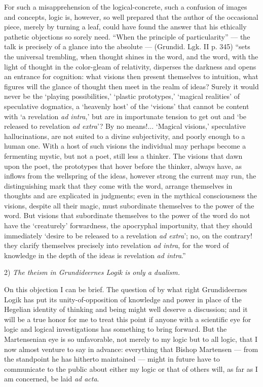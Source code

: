 \documentclass[12pt]{book}
\newcommand{\opage}[1]{\marginnote{\footnotesize\textit{[#1]}}}
\begin{document}
For such a misapprehension of the logical-concrete, such a confusion of images and concepts, logic is, however, so well prepared that the author of the occasional piece, merely by turning a leaf, could have found the answer that his ethically pathetic objections so sorely need. ``When the principle of particularity'' --- the talk is precisely of a glance into the absolute --- (Grundid. Lgk. II p. 345) ``sets the universal trembling, when thought shines in the word, and the word, with the light of thought in the color-gleam of relativity, disperses the darkness and opens an entrance for cognition: what visions then present themselves to intuition, what figures will the glance of thought then meet in the realm of ideas? Surely it would never be the `playing possibilities,' `plastic prototypes,' `magical realities' of speculative dogmatics, a `heavenly host' of the `visions' that cannot be content with `a revelation \textit{ad intra},' but are in importunate tension to get out and `be released to revelation \textit{ad extra}'? By no means!... `Magical visions,' speculative hallucinations, are not suited to a divine subjectivity, and poorly enough to a human one. With a host of such visions the individual may perhaps become a fermenting mystic, but not a poet, still less a thinker. The visions that dawn upon the poet, the prototypes that hover before the thinker, always have, as inflows from the wellspring of the ideas, however strong the current may run, the distinguishing mark that they come with the word, arrange themselves in thoughts and are explicated in judgments; even in the mythical consciousness the visions, despite all their magic, must subordinate themselves to the power of the word. But visions that subordinate themselves to the power of the word do not have the `creaturely' forwardness, the apocryphal importunity, that they should immediately `desire to be released to a revelation \textit{ad extra}'; no, on the contrary! they clarify themselves precisely into revelation
\opage{131}\setcounter{footnote}{0}%
\textit{ad intra}, for the word of knowledge in the depth of the ideas is revelation \textit{ad intra}.''

2) \emph{The theism in Grundideernes Logik is only a dualism.}

On this objection I can be brief. The question of by what right Grundideernes Logik has put its unity-of-opposition of knowledge and power in place of the Hegelian identity of thinking and being might well deserve a discussion; and it will be a true honor for me to treat this point if anyone with a scientific eye for logic and logical investigations has something to bring forward. But the Martensenian eye is so unfavorable, not merely to my logic but to all logic, that I now almost venture to say in advance: everything that Bishop Martensen --- from the standpoint he has hitherto maintained --- might in future have to communicate to the public about either my logic or that of others will, as far as I am concerned, be laid \textit{ad acta}.
\end{document}
